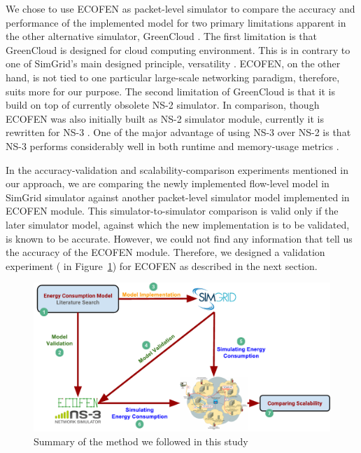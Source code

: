 We chose to use ECOFEN as packet-level simulator to compare the accuracy and performance of the implemented model for two primary limitations apparent in the other alternative simulator, GreenCloud \cite{DBLP:journals/tjs/KliazovichBK12}. The first limitation is that GreenCloud is designed for cloud computing environment. This is in contrary to one of SimGrid's main designed principle, versatility \cite{DBLP:journals/jpdc/CasanovaGLQS14}. ECOFEN, on the other hand, is not tied to one particular large-scale networking paradigm, therefore, suits more for our purpose. The second limitation of GreenCloud is that it is build on top of currently obsolete NS-2 simulator. In comparison, though ECOFEN was also initially built as NS-2 simulator module, currently it is rewritten for NS-3 \cite{DBLP:conf/cloudnet/CorneaOL14}. One of the major advantage of using NS-3 over NS-2 is that NS-3 performs considerably well in both runtime and memory-usage metrics \cite{DBLP:conf/icc/WeingartnerLW09}.

In the accuracy-validation and scalability-comparison experiments mentioned in our approach, we are comparing the newly implemented flow-level model in SimGrid simulator against another packet-level simulator model implemented in ECOFEN module. This simulator-to-simulator comparison is valid only if the later simulator model, against which the new implementation is to be validated, is known to be accurate. However, we could not find any information that tell us the accuracy of the ECOFEN module. Therefore, we designed a validation experiment ( in Figure~\ref{fig:approach}) for ECOFEN as described in the next section. 

\begin{figure}[ht]
	\begin{center}
		\includegraphics[width=16cm]{images/approach.pdf}
		\caption{Summary of the method we followed in this study}
		\label{fig:approach}
	\end{center}
\end{figure}
